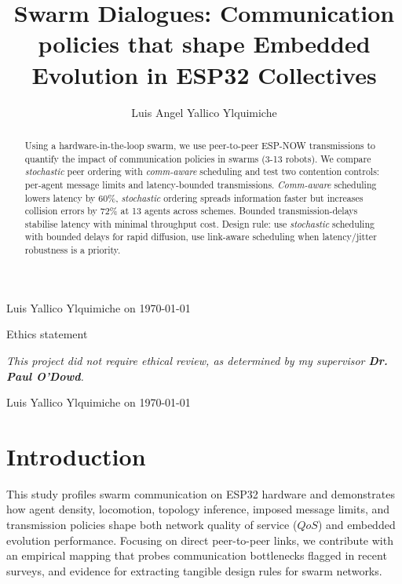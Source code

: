 \documentclass[conference]{IEEEtran}
\begin{document}
\begin{titlepage}
    \begin{flushright}
 
    Luis Yallico Ylquimiche on \today
    \end{flushright}

    \vspace{0.5cm}
    {\large{Ethics statement}}

    \textit{This project did not require ethical review, as determined by my supervisor \textbf{Dr. Paul O'Dowd}.}

    \begin{flushright}
 
    Luis Yallico Ylquimiche on \today
    \end{flushright}
 

\end{titlepage}


\title{Swarm Dialogues: Communication policies that shape Embedded Evolution in ESP32 Collectives}
\author{Luis Angel Yallico Ylquimiche}
\maketitle
\pagestyle{plain}

\begin{abstract}
Using a hardware-in-the-loop swarm, we use peer-to-peer ESP-NOW transmissions to quantify the impact of communication policies in swarms (3-13 robots). We compare \emph{stochastic} peer ordering with \emph{comm-aware} scheduling and test two contention controls: per-agent message limits and latency-bounded transmissions. \emph{Comm-aware} scheduling lowers latency by 60\%, \emph{stochastic} ordering spreads information faster but increases collision errors by 72\% at 13 agents across schemes. Bounded transmission-delays stabilise latency with minimal throughput cost. Design rule: use \emph{stochastic} scheduling with bounded delays for rapid diffusion, use link-aware scheduling when latency/jitter robustness is a priority.
\end{abstract}


\section{Introduction}

This study profiles swarm communication on ESP32 hardware and demonstrates how agent density, locomotion, topology inference, imposed message limits, and transmission policies shape both network quality of service ($QoS$) and embedded evolution performance. Focusing on direct peer-to-peer links, we contribute with an empirical mapping that probes communication bottlenecks flagged in recent surveys, and evidence for extracting tangible design rules for swarm networks. \\
\end{document}
